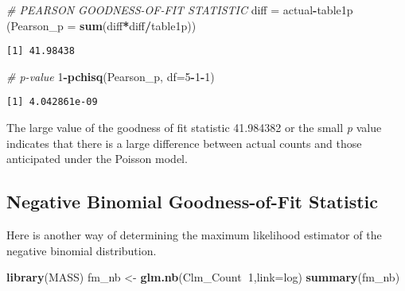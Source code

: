 \documentclass[]{book}
\newenvironment{Shaded}{\begin{snugshade}}{\end{snugshade}}
\newcommand{\KeywordTok}[1]{\textcolor[rgb]{0.13,0.29,0.53}{\textbf{#1}}}
\newcommand{\DataTypeTok}[1]{\textcolor[rgb]{0.13,0.29,0.53}{#1}}
\newcommand{\DecValTok}[1]{\textcolor[rgb]{0.00,0.00,0.81}{#1}}
\newcommand{\StringTok}[1]{\textcolor[rgb]{0.31,0.60,0.02}{#1}}
\newcommand{\CommentTok}[1]{\textcolor[rgb]{0.56,0.35,0.01}{\textit{#1}}}
\newcommand{\OperatorTok}[1]{\textcolor[rgb]{0.81,0.36,0.00}{\textbf{#1}}}
\newcommand{\NormalTok}[1]{#1}
\theoremstyle{definition}
\theoremstyle{definition}
\theoremstyle{definition}
\theoremstyle{remark}
\begin{document}
\begin{Shaded}
\begin{Highlighting}[]
\CommentTok{#  PEARSON GOODNESS-OF-FIT STATISTIC}
\NormalTok{diff =}\StringTok{ }\NormalTok{actual}\OperatorTok{-}\NormalTok{table1p}
\NormalTok{(}\DataTypeTok{Pearson_p =} \KeywordTok{sum}\NormalTok{(diff}\OperatorTok{*}\NormalTok{diff}\OperatorTok{/}\NormalTok{table1p))}
\end{Highlighting}
\end{Shaded}

\begin{verbatim}
[1] 41.98438
\end{verbatim}

\begin{Shaded}
\begin{Highlighting}[]
\CommentTok{#  p-value}
\DecValTok{1}\OperatorTok{-}\KeywordTok{pchisq}\NormalTok{(Pearson_p, }\DataTypeTok{df=}\DecValTok{5}\OperatorTok{-}\DecValTok{1}\OperatorTok{-}\DecValTok{1}\NormalTok{)}
\end{Highlighting}
\end{Shaded}

\begin{verbatim}
[1] 4.042861e-09
\end{verbatim}

The large value of the goodness of fit statistic 41.984382 or the small
\emph{p} value indicates that there is a large difference between actual
counts and those anticipated under the Poisson model.

\subsection{Negative Binomial Goodness-of-Fit
Statistic}\label{negative-binomial-goodness-of-fit-statistic}

Here is another way of determining the maximum likelihood estimator of
the negative binomial distribution.

\begin{Shaded}
\begin{Highlighting}[]
\KeywordTok{library}\NormalTok{(MASS)}
\NormalTok{fm_nb <-}\StringTok{ }\KeywordTok{glm.nb}\NormalTok{(Clm_Count}\OperatorTok{~}\DecValTok{1}\NormalTok{,}\DataTypeTok{link=}\NormalTok{log)}
\KeywordTok{summary}\NormalTok{(fm_nb)}
\end{Highlighting}
\end{Shaded}
\end{document}
